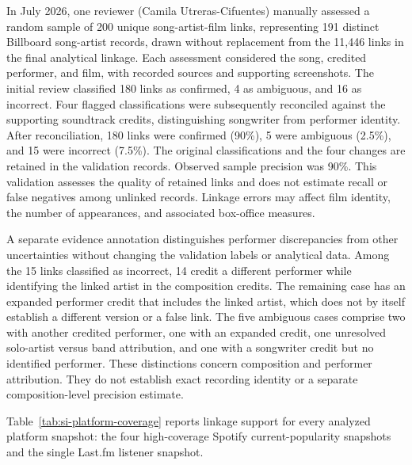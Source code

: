 \documentclass[11pt]{article}
\begin{document}
In July 2026, one reviewer (Camila Utreras-Cifuentes) manually assessed a random sample of 200 unique song-artist-film links, representing 191 distinct Billboard song-artist records, drawn without replacement from the 11,446 links in the final analytical linkage. Each assessment considered the song, credited performer, and film, with recorded sources and supporting screenshots. The initial review classified 180 links as confirmed, 4 as ambiguous, and 16 as incorrect. Four flagged classifications were subsequently reconciled against the supporting soundtrack credits, distinguishing songwriter from performer identity. After reconciliation, 180 links were confirmed (90\%), 5 were ambiguous (2.5\%), and 15 were incorrect (7.5\%). The original classifications and the four changes are retained in the validation records. Observed sample precision was 90\%. This validation assesses the quality of retained links and does not estimate recall or false negatives among unlinked records. Linkage errors may affect film identity, the number of appearances, and associated box-office measures.

A separate evidence annotation distinguishes performer discrepancies from other uncertainties without changing the validation labels or analytical data. Among the 15 links classified as incorrect, 14 credit a different performer while identifying the linked artist in the composition credits. The remaining case has an expanded performer credit that includes the linked artist, which does not by itself establish a different version or a false link. The five ambiguous cases comprise two with another credited performer, one with an expanded credit, one unresolved solo-artist versus band attribution, and one with a songwriter credit but no identified performer. These distinctions concern composition and performer attribution. They do not establish exact recording identity or a separate composition-level precision estimate.

Table~\ref{tab:si-platform-coverage} reports linkage support for every analyzed platform snapshot: the four high-coverage Spotify current-popularity snapshots and the single Last.fm listener snapshot.


\end{document}
